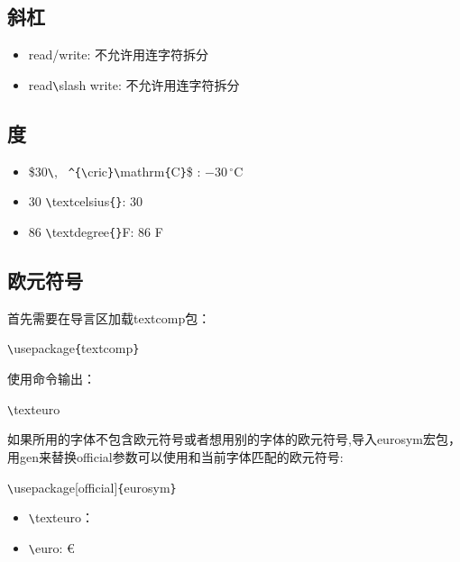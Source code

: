 \documentclass[UTF8]{ctexart}
\begin{document}
\subsection{斜杠}
\begin{itemize}
  \item read/write: 不允许用连字符拆分
  \item read\texttt{\textbackslash}slash write: 不允许用连字符拆分
\end{itemize}
\subsection{度}
\begin{itemize}
  \item \$30\texttt{\textbackslash}, \texttt{~\^}\texttt{\{}\texttt{\textbackslash}cric\texttt{\}}\texttt{\textbackslash}mathrm\texttt{\{}C\texttt{\}}\$ :
$-30\,^{\circ}\mathrm{C}$
  \item 30 \texttt{\textbackslash}textcelsius\texttt{\{}\texttt{\}}: 30 \textcelsius{}
  \item 86 \texttt{\textbackslash}textdegree\texttt{\{}\texttt{\}}F: 86 \textdegree{}F
\end{itemize}
\subsection{欧元符号}
 首先需要在导言区加载textcomp包：

 \texttt{\textbackslash}usepackage\texttt{\{}textcomp\texttt{\}}

 使用命令输出：

 \texttt{\textbackslash}texteuro

 如果所用的字体不包含欧元符号或者想用别的字体的欧元符号,导入eurosym宏包，用gen来替换official参数可以使用和当前字体匹配的欧元符号:

 \texttt{\textbackslash}usepackage[official]\texttt{\{}eurosym\texttt{\}}
 \begin{itemize}
  \item \texttt{\textbackslash}texteuro：\texteuro
  \item \texttt{\textbackslash}euro: \euro
\end{itemize}
\end{document}
